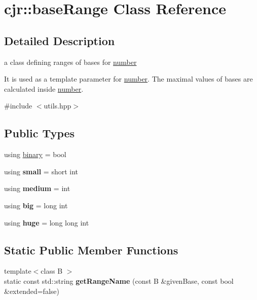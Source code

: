 \hypertarget{classcjr_1_1base_range}{\section{cjr\-:\-:base\-Range Class Reference}
\label{classcjr_1_1base_range}
}


\subsection{Detailed Description}
a class defining ranges of bases for \hyperlink{classcjr_1_1number}{number} 

It is used as a template parameter for \hyperlink{classcjr_1_1number}{number}. The maximal values of bases are calculated inside \hyperlink{classcjr_1_1number}{number}. 

{\ttfamily \#include $<$utils.\-hpp$>$}

\subsection*{Public Types}
\begin{DoxyCompactItemize}
\item 
using \hyperlink{classcjr_1_1base_range_a5f25722f51adfdcb6568431af1ac3cfb}{binary} = bool
\item 
\hypertarget{classcjr_1_1base_range_a2b08ecad9edd4a2dce0a9dc376d2fbd5}{using {\bfseries small} = short int}\label{classcjr_1_1base_range_a2b08ecad9edd4a2dce0a9dc376d2fbd5}

\item 
\hypertarget{classcjr_1_1base_range_aae4aa19dc5ab582bf196cbf913c743ca}{using {\bfseries medium} = int}\label{classcjr_1_1base_range_aae4aa19dc5ab582bf196cbf913c743ca}

\item 
\hypertarget{classcjr_1_1base_range_ad572b09254a0b5d48559271eceb420ff}{using {\bfseries big} = long int}\label{classcjr_1_1base_range_ad572b09254a0b5d48559271eceb420ff}

\item 
\hypertarget{classcjr_1_1base_range_a9ba9a270901aedd4344df7bd748ee03c}{using {\bfseries huge} = long long int}\label{classcjr_1_1base_range_a9ba9a270901aedd4344df7bd748ee03c}

\end{DoxyCompactItemize}
\subsection*{Static Public Member Functions}
\begin{DoxyCompactItemize}
\item 
\hypertarget{classcjr_1_1base_range_a353bdf3cc3ffade6dd4cac9c1cac7268}{{\footnotesize template$<$class B $>$ }\\static const std\-::string {\bfseries get\-Range\-Name} (const B \&given\-Base, const bool \&extended=false)}\label{classcjr_1_1base_range_a353bdf3cc3ffade6dd4cac9c1cac7268}

\end{DoxyCompactItemize}



